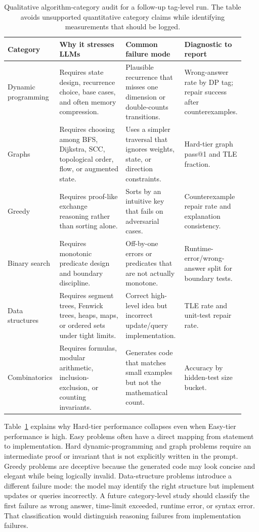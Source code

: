 \documentclass[11pt]{article}
\makeatletter
\newcommand{\passone}{pass@1}
\makeatother
\begin{document}
\begin{table}[t]
\centering
\small
\begin{tabular}{p{0.16\linewidth}p{0.30\linewidth}p{0.25\linewidth}p{0.22\linewidth}}
\toprule
Category & Why it stresses LLMs & Common failure mode & Diagnostic to report \\
\midrule
Dynamic programming & Requires state design, recurrence choice, base cases, and often memory compression. & Plausible recurrence that misses one dimension or double-counts transitions. & Wrong-answer rate by DP tag; repair success after counterexamples. \\
Graphs & Requires choosing among BFS, Dijkstra, SCC, topological order, flow, or augmented state. & Uses a simpler traversal that ignores weights, state, or direction constraints. & Hard-tier graph \passone{} and TLE fraction. \\
Greedy & Requires proof-like exchange reasoning rather than sorting alone. & Sorts by an intuitive key that fails on adversarial cases. & Counterexample repair rate and explanation consistency. \\
Binary search & Requires monotonic predicate design and boundary discipline. & Off-by-one errors or predicates that are not actually monotone. & Runtime-error/wrong-answer split for boundary tests. \\
Data structures & Requires segment trees, Fenwick trees, heaps, maps, or ordered sets under tight limits. & Correct high-level idea but incorrect update/query implementation. & TLE rate and unit-test repair rate. \\
Combinatorics & Requires formulas, modular arithmetic, inclusion-exclusion, or counting invariants. & Generates code that matches small examples but not the mathematical count. & Accuracy by hidden-test size bucket. \\
\bottomrule
\end{tabular}
\caption{Qualitative algorithm-category audit for a follow-up tag-level run. The table avoids unsupported quantitative category claims while identifying measurements that should be logged.}
\label{tab:category_audit}
\end{table}

Table~\ref{tab:category_audit} explains why Hard-tier performance collapses even when Easy-tier performance is high. Easy problems often have a direct mapping from statement to implementation. Hard dynamic-programming and graph problems require an intermediate proof or invariant that is not explicitly written in the prompt. Greedy problems are deceptive because the generated code may look concise and elegant while being logically invalid. Data-structure problems introduce a different failure mode: the model may identify the right structure but implement updates or queries incorrectly. A future category-level study should classify the first failure as wrong answer, time-limit exceeded, runtime error, or syntax error. That classification would distinguish reasoning failures from implementation failures.
\end{document}
